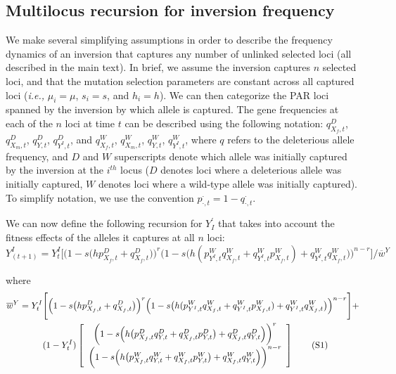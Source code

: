 \documentclass{article}
\newcommand\numberthis{\addtocounter{equation}{1}\tag{\theequation}}
\begin{document}
\begin{appendices}
\subsection{Multilocus recursion for inversion frequency} \label{subsec:multilocYI}

We make several simplifying assumptions in order to describe the frequency dynamics of an inversion that captures any number of unlinked selected loci (all described in the main text). In brief, we assume the inversion captures $n$ selected loci, and that the mutation selection parameters are constant across all captured loci ({\itshape i.e.,} $\mu_i = \mu$, $s_i = s$, and $h_i = h$). We can then categorize the PAR loci spanned by the inversion by which allele is captured. The gene frequencies at each of the $n$ loci at time $t$ can be described using the following notation: $q^{D}_{X_f,t}$, $q^{D}_{X_m,t}$, $q^{D}_{Y,t}$, $q^{D}_{Y^I,t}$, and $q^{W}_{X_f,t}$, $q^{W}_{X_m,t}$, $q^{W}_{Y,t}$, $q^{W}_{Y^I,t}$, where $q$ refers to the deleterious allele frequency, and $D$ and $W$ superscripts denote which allele was initially captured by the inversion at the $i^{th}$ locus ($D$ denotes loci where a deleterious allele was initially captured, $W$ denotes loci where a wild-type allele was initially captured). To simplify notation, we use the convention $p^{\cdot}_{\cdot,t} = 1 - q^{\cdot}_{\cdot,t}$. 

We can now define the following recursion for $Y^{\prime}_I$ that takes into account the fitness effects of the alleles it captures at all $n$ loci:
\begin{equation} \label{eq:YIprime-multiLoc}
	Y^I_{(t + 1)} = Y^I_t \Bigg[ \Big(1 - s \big(h p^{D}_{X_f,t} + q^{D}_{X_f,t} \big) \Big)^{r}\Big(1 - s \big(h (p^{W}_{Y^I,t} q^{W}_{X_f,t} + q^{W}_{Y^I,t} p^{W}_{X_f,t}) + q^{W}_{Y^I,t} q^{W}_{X_f,t} \big) \Big)^{n-r} \Bigg] \Bigg/ \overline{w}^Y
\end{equation}

\noindent where 
\begin{align*}\label{eq:wBarY-multiLoc}
	\overline{w}^Y = Y^I_t &\Bigg[ \Big(1 - s \big(h p^{D}_{X_f,t} + q^{D}_{X_f,t} \big) \Big)^{r}\Big(1 - s \big(h (p^{W}_{Y^I,t} q^{W}_{X_f,t} + q^{W}_{Y^I,t} p^{W}_{X_f,t}) + q^{W}_{Y^I,t} q^{W}_{X_f,t} \big) \Big)^{n-r} \Bigg] + \\
	&(1 - Y^I_t) \left[\begin{array}{c}
											\bigg( 1 - s \Big( h \big( p^{D}_{X_f,t} q^{D}_{Y,t} +  q^{D}_{X_f,t} p^{D}_{Y,t} \big) + q^{D}_{X_f,t} q^{D}_{Y,t} \Big) \bigg)^r\\
											\bigg( 1 - s \Big( h \big( p^{W}_{X_f,t} q^{W}_{Y,t} +  q^{W}_{X_f,t} p^{W}_{Y,t} \big) + q^{W}_{X_f,t} q^{W}_{Y,t} \Big) \bigg)^{n-r}
											\end{array} \right] \numberthis
\end{align*}


\end{appendices}
\end{document}
